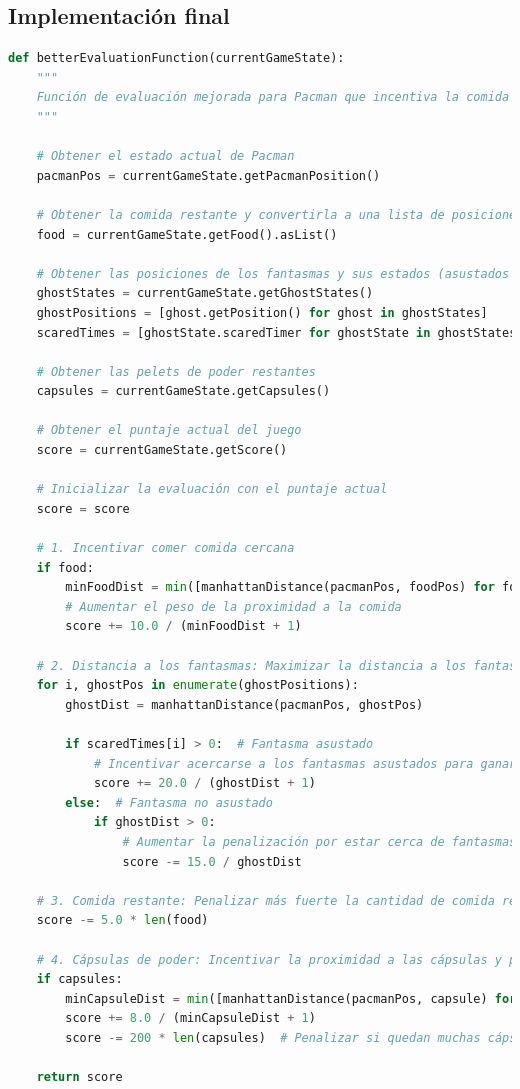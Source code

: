 \documentclass{report}
\begin{document}
        \subsection*{Implementación final}
          \begin{lstlisting}[language=Python, caption=Implementación final de la función de evaluación]
def betterEvaluationFunction(currentGameState):
    """
    Función de evaluación mejorada para Pacman que incentiva la comida cercana y evita la inactividad.
    """

    # Obtener el estado actual de Pacman
    pacmanPos = currentGameState.getPacmanPosition()
    
    # Obtener la comida restante y convertirla a una lista de posiciones
    food = currentGameState.getFood().asList()
    
    # Obtener las posiciones de los fantasmas y sus estados (asustados o no)
    ghostStates = currentGameState.getGhostStates()
    ghostPositions = [ghost.getPosition() for ghost in ghostStates]
    scaredTimes = [ghostState.scaredTimer for ghostState in ghostStates]
    
    # Obtener las pelets de poder restantes
    capsules = currentGameState.getCapsules()
    
    # Obtener el puntaje actual del juego
    score = currentGameState.getScore()
    
    # Inicializar la evaluación con el puntaje actual
    score = score

    # 1. Incentivar comer comida cercana
    if food:
        minFoodDist = min([manhattanDistance(pacmanPos, foodPos) for foodPos in food])
        # Aumentar el peso de la proximidad a la comida
        score += 10.0 / (minFoodDist + 1)

    # 2. Distancia a los fantasmas: Maximizar la distancia a los fantasmas (si no están asustados)
    for i, ghostPos in enumerate(ghostPositions):
        ghostDist = manhattanDistance(pacmanPos, ghostPos)
        
        if scaredTimes[i] > 0:  # Fantasma asustado
            # Incentivar acercarse a los fantasmas asustados para ganar puntos al comérselos
            score += 20.0 / (ghostDist + 1)
        else:  # Fantasma no asustado
            if ghostDist > 0:
                # Aumentar la penalización por estar cerca de fantasmas no asustados
                score -= 15.0 / ghostDist

    # 3. Comida restante: Penalizar más fuerte la cantidad de comida restante
    score -= 5.0 * len(food)

    # 4. Cápsulas de poder: Incentivar la proximidad a las cápsulas y penalizar su cantidad restante
    if capsules:
        minCapsuleDist = min([manhattanDistance(pacmanPos, capsule) for capsule in capsules])
        score += 8.0 / (minCapsuleDist + 1)
        score -= 200 * len(capsules)  # Penalizar si quedan muchas cápsulas sin recoger
        
    return score
        
          \end{lstlisting}
\end{document}
